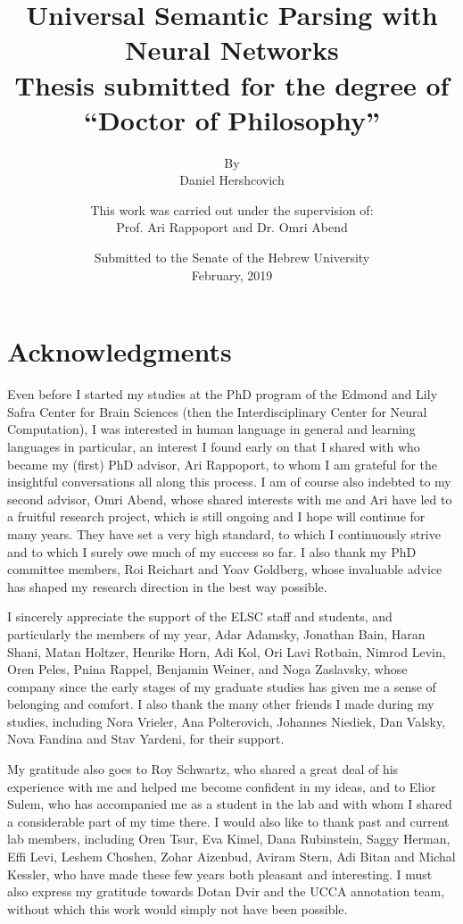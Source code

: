 \documentclass[12pt,a4paper]{report}
\title{
\textbf{Universal Semantic Parsing with Neural Networks} \\
\vspace{2cm}
{\large Thesis submitted for the degree of \\
``Doctor of Philosophy''}
}
\author{
By \\
Daniel Hershcovich
\vspace{2cm}
}
\date{
Submitted to the Senate of the Hebrew University \\
February, 2019
}
\begin{document}
\maketitle
\maketitle
\clearpage
\title{}
\author{
This work was carried out under the supervision of: \\
Prof. Ari Rappoport and Dr. Omri Abend
}
\date{}
\maketitle

\section*{Acknowledgments}

Even before I started my studies at the PhD program of
the Edmond and Lily Safra Center for Brain Sciences
(then the Interdisciplinary Center for Neural Computation),
I was interested in human language in general and learning languages
in particular, an interest I found early on that I shared with who became
my (first) PhD advisor, Ari Rappoport, to whom I am grateful for the
insightful conversations all along this process.
I am of course also indebted to my second advisor, Omri Abend,
whose shared interests with me and Ari have led to a fruitful
research project, which is still ongoing and I hope will continue for
many years.
They have set a very high standard, to which I continuously strive
and to which I surely owe much of my success so far.
I also thank my PhD committee members, Roi Reichart and Yoav Goldberg,
whose invaluable advice has shaped my research direction in the best way possible.

I sincerely appreciate the support of the ELSC staff and students,
and particularly the members of my year,
Adar Adamsky, Jonathan Bain, Haran Shani, Matan Holtzer, Henrike Horn, Adi Kol,
Ori Lavi Rotbain, Nimrod Levin, Oren Peles, Pnina Rappel, Benjamin Weiner, and
Noga Zaslavsky, whose company since the early stages of my graduate studies
has given me a sense of belonging and comfort.
I also thank the many other friends I made during my studies, including Nora Vrieler,
Ana Polterovich, Johannes Niediek, Dan Valsky, Nova Fandina and Stav Yardeni,
for their support.

My gratitude also goes to Roy Schwartz, who shared a great deal of his
experience with me and helped me become confident in my ideas, and to
Elior Sulem, who has accompanied me as a student in the lab and with whom
I shared a considerable part of my time there.
I would also like to thank past and current lab members, including Oren Tsur,
Eva Kimel, Dana Rubinstein, Saggy Herman, Effi Levi, Leshem Choshen, Zohar Aizenbud,
Aviram Stern, Adi Bitan and Michal Kessler, who have made these few years both
pleasant and interesting.
I must also express my gratitude towards Dotan Dvir and the UCCA annotation team,
without which this work would simply not have been possible.
\end{document}
